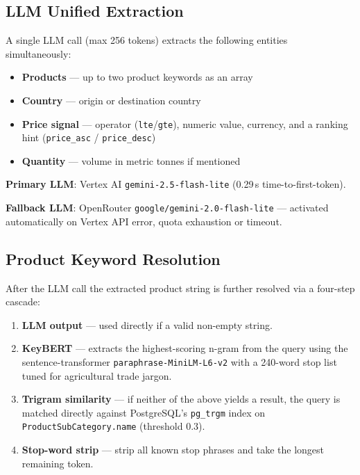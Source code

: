 \documentclass[12pt,a4paper]{article}
\begin{document}
\subsection{LLM Unified Extraction}

A single LLM call (max 256 tokens) extracts the following entities simultaneously:

\begin{itemize}
  \item \textbf{Products} --- up to two product keywords as an array
  \item \textbf{Country} --- origin or destination country
  \item \textbf{Price signal} --- operator (\texttt{lte}/\texttt{gte}), numeric value,
        currency, and a ranking hint (\texttt{price\_asc} / \texttt{price\_desc})
  \item \textbf{Quantity} --- volume in metric tonnes if mentioned
\end{itemize}

\textbf{Primary LLM}: Vertex AI \texttt{gemini-2.5-flash-lite} (0.29\,s time-to-first-token).

\textbf{Fallback LLM}: OpenRouter \texttt{google/gemini-2.0-flash-lite} --- activated
automatically on Vertex API error, quota exhaustion or timeout.

\subsection{Product Keyword Resolution}

After the LLM call the extracted product string is further resolved via a four-step
cascade:

\begin{enumerate}
  \item \textbf{LLM output} --- used directly if a valid non-empty string.
  \item \textbf{KeyBERT} --- extracts the highest-scoring n-gram from the query using
        the sentence-transformer \texttt{paraphrase-MiniLM-L6-v2} with a 240-word stop
        list tuned for agricultural trade jargon.
  \item \textbf{Trigram similarity} --- if neither of the above yields a result,
        the query is matched directly against PostgreSQL's \texttt{pg\_trgm} index on
        \texttt{ProductSubCategory.name} (threshold 0.3).
  \item \textbf{Stop-word strip} --- strip all known stop phrases and take the
        longest remaining token.
\end{enumerate}
\end{document}
